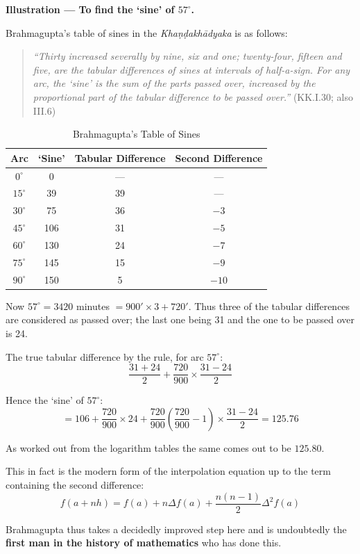 \documentclass[11pt,a4paper]{article}
\begin{document}
\textbf{Illustration --- To find the `sine' of $57^\circ$.}

Brahmagupta's table of sines in the \textit{Khaṇḍakhādyaka} is as follows:

\begin{quote}
\textit{``Thirty increased severally by nine, six and one; twenty-four, fifteen and five, are the tabular differences of sines at intervals of half-a-sign. For any arc, the `sine' is the sum of the parts passed over, increased by the proportional part of the tabular difference to be passed over.''} (KK.I.30; also III.6)
\end{quote}

\begin{table}[h]
\centering
\caption{Brahmagupta's Table of Sines}
\begin{tabular}{@{}cccc@{}}
\toprule
\textbf{Arc} & \textbf{`Sine'} & \textbf{Tabular Difference} & \textbf{Second Difference} \\
\midrule
$0^\circ$ & 0 & --- & --- \\
$15^\circ$ & 39 & 39 & --- \\
$30^\circ$ & 75 & 36 & $-3$ \\
$45^\circ$ & 106 & 31 & $-5$ \\
$60^\circ$ & 130 & 24 & $-7$ \\
$75^\circ$ & 145 & 15 & $-9$ \\
$90^\circ$ & 150 & 5 & $-10$ \\
\bottomrule
\end{tabular}
\end{table}

Now $57^\circ = 3420$ minutes $= 900' \times 3 + 720'$. Thus three of the tabular differences are considered as passed over; the last one being 31 and the one to be passed over is 24.

The true tabular difference by the rule, for arc $57^\circ$:
\[
\frac{31+24}{2} + \frac{720}{900} \times \frac{31-24}{2}
\]

Hence the `sine' of $57^\circ$:
\[
= 106 + \frac{720}{900} \times 24 + \frac{720}{900}\left(\frac{720}{900}-1\right) \times \frac{31-24}{2}
= 125.76
\]

As worked out from the logarithm tables the same comes out to be $125.80$.

This in fact is the modern form of the interpolation equation up to the term containing the second difference:
\[
f(a + nh) = f(a) + n\Delta f(a) + \frac{n(n-1)}{2}\Delta^2 f(a)
\]

Brahmagupta thus takes a decidedly improved step here and is undoubtedly the \textbf{first man in the history of mathematics} who has done this.
\end{document}
